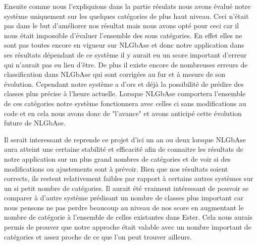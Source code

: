 \documentclass[10pt,a4paper]{article}
\begin{document}
\par Ensuite comme nous l'expliquions dans la partie résulats nous avons évalué notre système uniquement sur les quelques catégories de plus haut niveau. Ceci n'était pas dans le but d'améliorer nos résultat mais nous avons opté pour ceci car il nous était impossible d'évaluer l'ensemble des sous catégories. En effet elles ne sont pas toutes encore en vigueur sur NLGbAse et donc notre application dans ses résultats dépendant de ce système il y aurait eu un score important d'erreur qui n'aurait pas eu lieu d'être. De plus il existe encore de nombreuses erreurs de classification dans NLGbAse qui sont corrigées au fur et à mesure de son évolution. Cependant notre système a d'ors et déjà la possibilité de prédire des classes plus précise à l'heure actuelle. Lorsque NLGbAse comportera l'ensemble de ces catégories notre système fonctionnera avec celles ci sans modifications au code et en cela nous avons donc de "l'avance" et avons anticipé cette évolution future de NLGbAse.
\par Il serait interessant de reprende ce projet d'ici un an ou deux lorsque NLGbAse aura atteint une certaine stabilité et efficacité afin de connaitre les résultats de notre application sur un plus grand nombres de catégories et de voir si des modifications ou ajustements sont à prévoir. Bien que nos résultats soient corrects, ils restent relativement faibles par rapport à certains autres systèmes sur un si petit nombre de catégories. Il aurait été vraiment intéressant de pouvoir se comparer à d'autre système prédisant un nombre de classes plus important car nous pensons ne pas perdre beaucoup au niveau de nos score en augmentant le nombre de catégorie à l'ensemble de celles existantes dans Ester. Cela nous aurais permis de prouver que notre approche était valable avec un nombre important de catégories et assez proche de ce que l'on peut trouver ailleurs.
\end{document}
